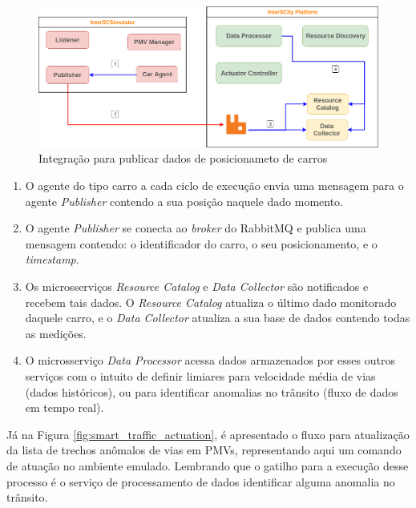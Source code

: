 \begin{figure}[ht]
	\centering
	\includegraphics[width=\textwidth]{figuras/integration-publish-car-position.png}
	\caption{Integração para publicar dados de posicionameto de carros}
	\label{fig:smart_traffic_publish_data}
\end{figure}

\begin{enumerate}
    \item O agente do tipo carro a cada ciclo de execução envia uma mensagem para o agente \textit{Publisher} contendo a sua posição naquele dado momento.

    \item O agente \textit{Publisher} se conecta ao \textit{broker} do RabbitMQ e publica uma mensagem contendo: o identificador do carro, o seu posicionamento, e o \textit{timestamp}.

    \item Os microsserviços \textit{Resource Catalog} e \textit{Data Collector} são notificados e recebem tais dados. O \textit{Resource Catalog} atualiza o último dado monitorado
        daquele carro, e o \textit{Data Collector} atualiza a sua base de dados contendo todas as medições.

    \item O microsserviço \textit{Data Processor} acessa dados armazenados por esses outros serviços com o intuito de definir limiares para velocidade média de vias (dados históricos),
        ou para identificar anomalias no trânsito (fluxo de dados em tempo real).
\end{enumerate}

Já na Figura \ref{fig:smart_traffic_actuation}, é apresentado o fluxo para atualização da lista de trechos anômalos de vias em PMVs, representando aqui um comando de atuação no
ambiente emulado.
Lembrando que o gatilho para a execução desse processo é o serviço de processamento de dados identificar alguma anomalia no trânsito.

